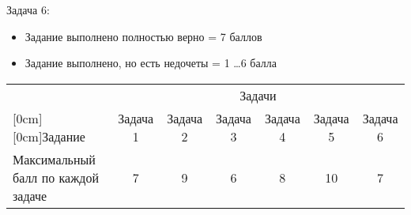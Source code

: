 Задача 6:

\begin{itemize}
    \item	Задание выполнено полностью верно = 7 баллов 
    \item	Задание выполнено, но есть недочеты = 1 \dots 6 балла
\end{itemize}

\begin{table}[H]
    \begin{center}
        \begin{tabular}{|p{3cm}|c|c|c|c|c|c|}
        \hline
        & \multicolumn{6}{c|}{Задачи} \\
        \cline{2-6}
        \raisebox{1.5ex}[0cm][0cm]{Задание}
        & Задача 1 & Задача 2 & Задача 3 & Задача 4 & Задача 5 & Задача 6\\
        \hline
        Максимальный балл по каждой задаче & 7 & 9 &6&	8	&10&	7\\
        \hline
        \end{tabular}
    \end{center}
\end{table}